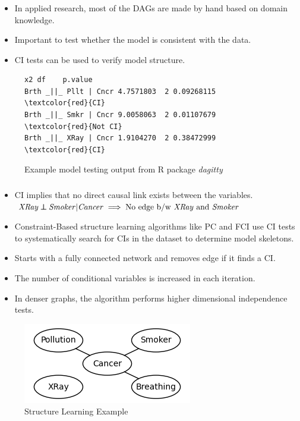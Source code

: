 \documentclass{beamer}
\def\ci{\perp\!\!\!\!\!\perp}
\begin{document}
\begin{frame}[fragile]
	\frametitle{}
	\begin{itemize}
		\setlength\itemsep{1em}
		\item In applied research, most of the DAGs are made by hand
			based on domain knowledge.
		\item Important to test whether the model is consistent with the data.
		\item CI tests can be used to verify model structure.
	\end{itemize}
	\begin{figure}
	\begin{Verbatim}[commandchars=\\\{\}, frame=single]
                             x2 df    p.value
Brth _||_ Pllt | Cncr 4.7571803  2 0.09268115 \textcolor{red}{CI}
Brth _||_ Smkr | Cncr 9.0058063  2 0.01107679 \textcolor{red}{Not CI}
Brth _||_ XRay | Cncr 1.9104270  2 0.38472999 \textcolor{red}{CI}
 	\end{Verbatim}
		\caption*{Example model testing output from R package \emph{dagitty}}
	\end{figure}

\end{frame}

\begin{frame}
	\frametitle{}
	\begin{itemize}
		\setlength\itemsep{1em}
		\item CI implies that no direct causal link exists between the variables. \newline
			$ \text{\emph{XRay}} \ci \text{\emph{Smoker}} | \text{\emph{Cancer}} \implies \text{No edge b/w \emph{XRay} and \emph{Smoker}} $
		\item Constraint-Based structure learning algorithms like PC
			and FCI use CI tests to systematically search for CIs
			in the dataset to determine model skeletons.
		\item Starts with a fully connected network and removes edge if it finds a CI.
		\item The number of conditional variables is increased in each iteration.
		\item In denser graphs, the algorithm performs higher dimensional independence tests.
	\end{itemize}
	\begin{figure}
		\centering
		\includegraphics[scale=0.6]{imgs/example_sl.png}
		\caption*{Structure Learning Example}
	\end{figure}
\end{frame}
\end{document}
